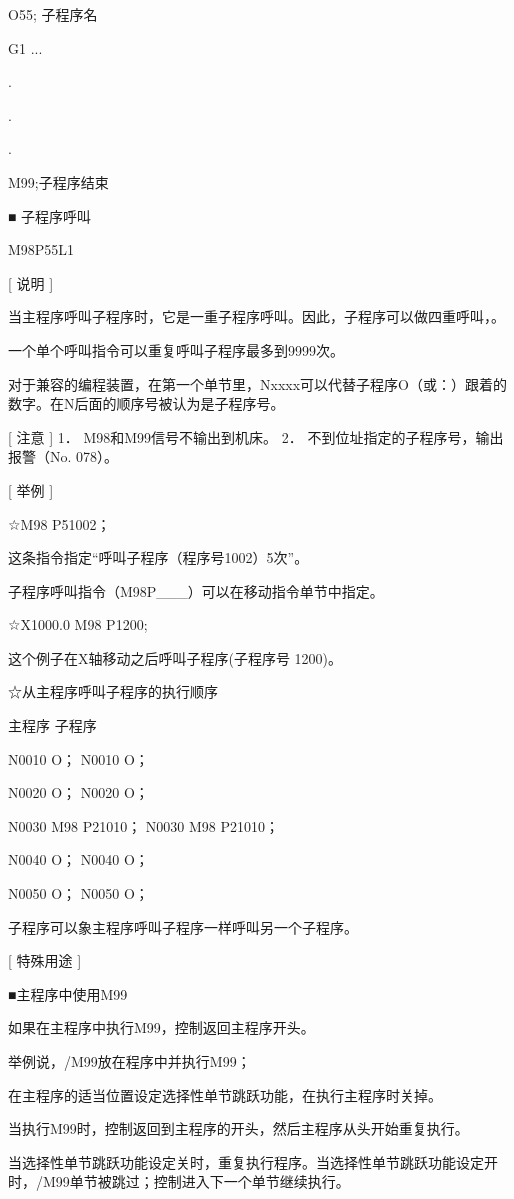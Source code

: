 O55; 子程序名

G1 ...

.

.

.

M99;子程序结束


■	子程序呼叫

M98P55L1

[ 说明 ]

当主程序呼叫子程序时，它是一重子程序呼叫。因此，子程序可以做四重呼叫，。                                                 

一个单个呼叫指令可以重复呼叫子程序最多到9999次。

对于兼容的编程装置，在第一个单节里，Nxxxx可以代替子程序O（或：）跟着的数字。在N后面的顺序号被认为是子程序号。

[ 注意 ]
1．	M98和M99信号不输出到机床。
2．	不到位址指定的子程序号，输出报警（No. 078）。

[ 举例 ]

☆M98 P51002；

这条指令指定“呼叫子程序（程序号1002）5次”。

子程序呼叫指令（M98P\_\_\_）可以在移动指令单节中指定。

☆X1000.0 M98 P1200;

这个例子在X轴移动之后呼叫子程序(子程序号 1200)。

☆从主程序呼叫子程序的执行顺序

主程序                   子程序

N0010 O；               N0010 O；   
      
N0020 O；               N0020 O；    
     
N0030 M98 P21010；      N0030 M98 P21010； 
                
N0040 O；               N0040 O；
             
N0050 O；               N0050 O；

子程序可以象主程序呼叫子程序一样呼叫另一个子程序。

[ 特殊用途 ]
 
■主程序中使用M99

如果在主程序中执行M99，控制返回主程序开头。

举例说，/M99放在程序中并执行M99；

在主程序的适当位置设定选择性单节跳跃功能，在执行主程序时关掉。

当执行M99时，控制返回到主程序的开头，然后主程序从头开始重复执行。

当选择性单节跳跃功能设定关时，重复执行程序。当选择性单节跳跃功能设定开时，/M99单节被跳过；控制进入下一个单节继续执行。

